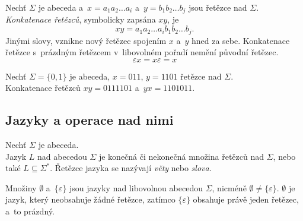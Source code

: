 \begin{definition}
    Nechť $\Sigma$ je abeceda a~$x = a_1a_2\ldots a_i$ a~$y = b_1b_2\ldots b_j$ jsou řetězce nad $\Sigma$.\\
    \emph{Konkatenace řetězců}, symbolicky zapsána $xy$, je
    \begin{equation*}
        xy = a_1a_2\ldots a_ib_1b_2\ldots b_j.
    \end{equation*}
    Jinými slovy, vznikne nový řetězec spojením $x$ a~$y$ hned za sebe.
    Konkatenace řetězce s~prázdným řetězcem v~libovolném pořadí nemění původní řetězec.
    \begin{equation*}
        \varepsilon x = x\varepsilon = x
    \end{equation*}
\end{definition}

\begin{example}
    Nechť $\Sigma = \{0, 1\}$ je abeceda, $x = 011$, $y = 1101$ řetězce nad $\Sigma$.\\
    Konkatenace řetězců $xy = 0111101$ a~$yx = 1101011$.
\end{example}

\subsection*{Jazyky a operace nad nimi}
\begin{definition}
    Nechť $\Sigma$ je abeceda. \\
    Jazyk $L$ nad abecedou $\Sigma$ je konečná či nekonečná množina řetězců nad $\Sigma$, nebo také $L \subseteq \Sigma^*$.
    Řetězce jazyka se nazývají \emph{věty} nebo \emph{slova}.

    Množiny $\emptyset$ a~$\{\varepsilon\}$ jsou jazyky nad libovolnou abecedou $\Sigma$, nicméně $\emptyset \neq \{\varepsilon\}$. $\emptyset$ je jazyk, který neobsahuje žádné řetězce, zatímco $\{\varepsilon\}$ obsahuje právě jeden řetězec, a~to prázdný.
\end{definition}

